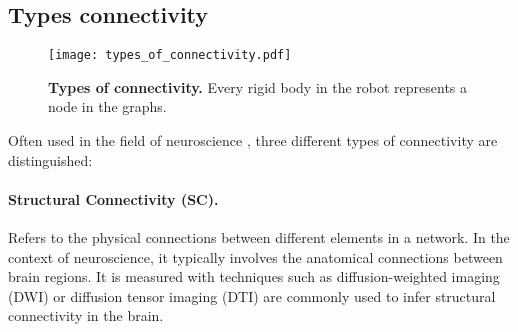 \subsection{Types connectivity}

\begin{figure*}[!h]
	\centering	
	\hspace*{\fill}
	\texttt{[image: types\_of\_connectivity.pdf]}
	\hspace*{\fill}	
	\caption[] {\label{fig:types_of_connectivity}\textbf{Types of connectivity.} Every rigid body in the robot represents a node in the graphs.}
\end{figure*}

Often used in the field of neuroscience \cite{Karwowski2019Applicationgraphtheory}, three different types of connectivity are distinguished\cite{Park2013Structuralfunctionalbrain,FaskowitzEdgesbrainnetworks}:

\paragraph*{Structural Connectivity (SC).} Refers to the physical connections between different elements in a network. In the context of neuroscience, it typically involves the anatomical connections between brain regions. It is measured with techniques such as diffusion-weighted imaging (DWI) or diffusion tensor imaging (DTI) are commonly used to infer structural connectivity in the brain.

